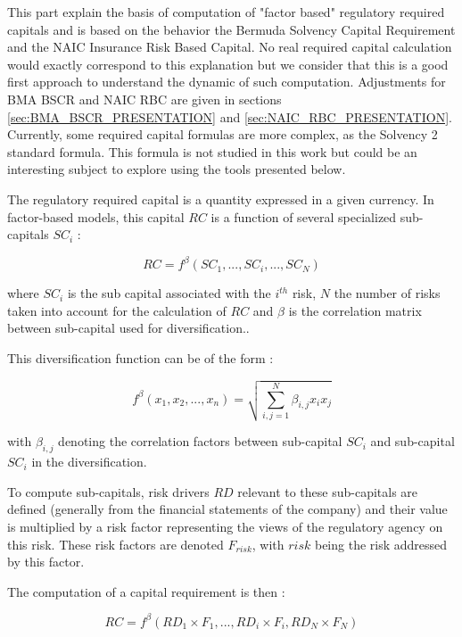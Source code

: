 This part explain the basis of computation of "factor based" regulatory required capitals and is based on the behavior the Bermuda Solvency Capital Requirement and the NAIC Insurance Risk Based Capital. No real required capital calculation would exactly correspond to this explanation but we consider that this is a good first approach to understand the dynamic of such computation. Adjustments for BMA BSCR and NAIC RBC are given in sections \ref{sec:BMA_BSCR_PRESENTATION} and \ref{sec:NAIC_RBC_PRESENTATION}. Currently, some required capital formulas are more complex, as the Solvency 2 standard formula. This formula is not studied in this work but could be an interesting subject to explore using the tools presented below.

The regulatory required capital is a quantity expressed in a given currency. In factor-based models, this capital $RC$ is a function of several specialized sub-capitals $SC_i$ :

\begin{equation}
	RC = f^{\beta}(SC_1, ..., SC_i, ..., SC_N)
\end{equation}

where $SC_i$ is the sub capital associated with the $i^{th}$ risk, $N$ the number of risks taken into account for the calculation of $RC$ and $\beta$ is the correlation matrix between sub-capital used for diversification..

This diversification function can be of the form :

\begin{equation}
	\label{eq:DIVERSIFICATION}
	f^{\beta}(x_1, x_2, ..., x_n) = \sqrt{\sum_{i,j=1}^{N} \beta_{i,j} x_i x_j}
\end{equation}

with $\beta_{i,j}$ denoting the correlation factors between sub-capital $SC_i$ and sub-capital $SC_i$ in the diversification.

To compute sub-capitals, risk drivers $RD$ relevant to these sub-capitals are defined (generally from the financial statements of the company) and their value is multiplied by a risk factor representing the views of the regulatory agency on this risk. These risk factors are denoted $F_{risk}$, with $risk$ being the risk addressed by this factor.

The computation of a capital requirement is then :

\begin{equation}
	RC = f^{\beta}(RD_1 \times F_1,... , RD_i \times F_i, RD_N \times F_N)
\end{equation}

